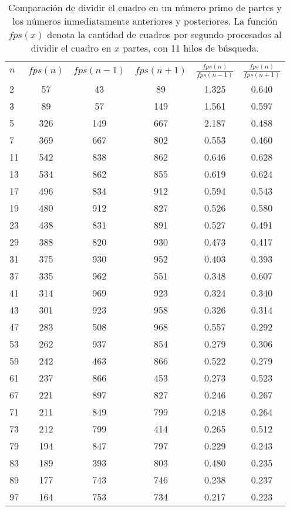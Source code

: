 \begin{table}[!h]
\begin{tabular}{l|c|c|c|c|c}
	$n$ & $fps(n)$ & $fps(n-1)$ & $fps(n+1)$ &
	$\frac{fps(n)}{fps(n-1)}$ &
	$\frac{fps(n)}{fps(n+1)}$ \\
	2 & 57 & 43 & 89 & 1.325 & 0.640 \\
	3 & 89 & 57 & 149 & 1.561 & 0.597 \\
	5 & 326 & 149 & 667 & 2.187 & 0.488 \\
	7 & 369 & 667 & 802 & 0.553 & 0.460 \\
	11 & 542 & 838 & 862 & 0.646 & 0.628 \\
	13 & 534 & 862 & 855 & 0.619 & 0.624 \\
	17 & 496 & 834 & 912 & 0.594 & 0.543 \\
	19 & 480 & 912 & 827 & 0.526 & 0.580 \\
	23 & 438 & 831 & 891 & 0.527 & 0.491 \\
	29 & 388 & 820 & 930 & 0.473 & 0.417 \\
	31 & 375 & 930 & 952 & 0.403 & 0.393 \\
	37 & 335 & 962 & 551 & 0.348 & 0.607 \\
	41 & 314 & 969 & 923 & 0.324 & 0.340 \\
	43 & 301 & 923 & 958 & 0.326 & 0.314 \\
	47 & 283 & 508 & 968 & 0.557 & 0.292 \\
	53 & 262 & 937 & 854 & 0.279 & 0.306 \\
	59 & 242 & 463 & 866 & 0.522 & 0.279 \\
	61 & 237 & 866 & 453 & 0.273 & 0.523 \\
	67 & 221 & 897 & 827 & 0.246 & 0.267 \\
	71 & 211 & 849 & 799 & 0.248 & 0.264 \\
	73 & 212 & 799 & 414 & 0.265 & 0.512 \\
	79 & 194 & 847 & 797 & 0.229 & 0.243 \\
	83 & 189 & 393 & 803 & 0.480 & 0.235 \\
	89 & 177 & 743 & 746 & 0.238 & 0.237 \\
	97 & 164 & 753 & 734 & 0.217 & 0.223 \\

\end{tabular}

\caption{Comparación de dividir el cuadro en un número primo de partes y los
	números inmediatamente anteriores y posteriores. La función $fps(x)$
	denota la cantidad de cuadros por segundo procesados al dividir el
	cuadro en $x$ partes, con 11 hilos de búsqueda.}
\label{tabPrimos}
\end{table}


